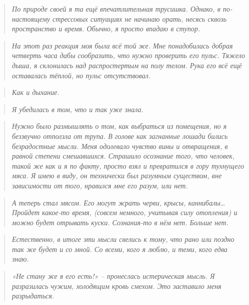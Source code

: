 \documentclass[
  a5paperpaper,
  DIV=11,
  numbers=noendperiod]{scrreprt}
\begin{document}
\begin{quote}
\emph{По природе своей я та ещё впечатлительная трусишка. Однако, в
по-настоящему стрессовых ситуациях не начинаю орать, несясь сквозь
пространство и время. Обычно, я просто впадаю в ступор.}
\end{quote}

\begin{quote}
\emph{На этот раз реакция моя была всё той же. Мне понадобилась добрая
четверть часа дабы сообразить, что нужно проверить его пульс. Тяжело
дыша, я склонилась над распростертым на полу телом. Рука его всё ещё
оставалась тёплой, но пульс отсутствовал.}
\end{quote}

\begin{quote}
\emph{Как и дыхание.}
\end{quote}

\begin{quote}
\emph{Я убедилась в том, что и так уже знала.}
\end{quote}

\begin{quote}
\emph{Нужно было размышлять о том, как выбраться из помещения, но я
беззвучно отползла от трупа. В голове как загнанные лошади бились
безрадостные мысли. Меня одолевало чувство вины и отвращения, в равной
степени смешавшихся. Страшило осознание того, что человек, такой же как
и я по факту, просто взял и превратился в гору тухнущего мяса. Я имею в
виду, он технически был разумным существом, вне зависимости от того,
нравился мне его разум, или нет. }
\end{quote}

\begin{quote}
\emph{А теперь стал мясом. Его могут жрать черви, крысы,
каннибалы\ldots{} Пройдет какое-то время, (совсем немного, учитывая силу
отопления) и можно будет отрывать куски. Сознания-то в нём нет. Больше
нет. }
\end{quote}

\begin{quote}
\emph{Естественно, в итоге эти мысли свелись к тому, что рано или поздно
так же будет и со мной. Со всеми, кого я люблю, и теми, кого едва знаю.}
\end{quote}

\begin{quote}
\emph{«Не стану же я его есть!» -- пронеслась истерическая мысль. Я
разразилась чужим, холодящим кровь смехом. Это заставило меня
разрыдаться. }
\end{quote}
\end{document}
